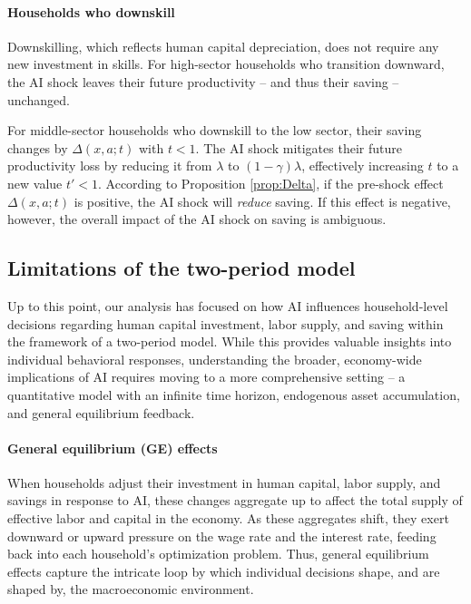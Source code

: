 \documentclass[12pt]{article}
\begin{document}
\paragraph{Households who downskill} Downskilling, which reflects human capital depreciation, does not require any new investment in skills. For high-sector households who transition downward, the AI shock leaves their future productivity -- and thus their saving -- unchanged.

For middle-sector households who downskill to the low sector, their saving changes by $\Delta(x,a;t)$ with $t<1$. The AI shock mitigates their future productivity loss by reducing it from $\lambda$ to $(1-\gamma)\lambda$, effectively increasing $t$ to a new value $t'<1$. According to Proposition \ref{prop:Delta}, if the pre-shock effect $\Delta(x,a;t)$ is positive, the AI shock will \textit{reduce} saving. If this effect is negative, however, the overall impact of the AI shock on saving is ambiguous.





\subsection{Limitations of the two-period model}
Up to this point, our analysis has focused on how AI influences household-level decisions regarding human capital investment, labor supply, and saving within the framework of a two-period model. While this provides valuable insights into individual behavioral responses, understanding the broader, economy-wide implications of AI requires moving to a more comprehensive setting -- a quantitative model with an infinite time horizon, endogenous asset accumulation, and general equilibrium feedback.

\paragraph{General equilibrium (GE) effects} When households adjust their investment in human capital, labor supply, and savings in response to AI, these changes aggregate up to affect the total supply of effective labor and capital in the economy. As these aggregates shift, they exert downward or upward pressure on the wage rate and the interest rate, feeding back into each household’s optimization problem. Thus, general equilibrium effects capture the intricate loop by which individual decisions shape, and are shaped by, the macroeconomic environment.
\end{document}

